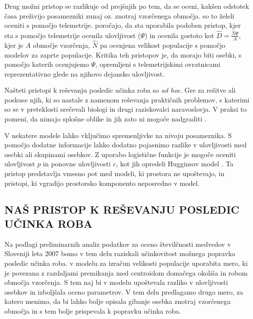 Drug možni pristop se razlikuje od prejšnjih po tem, da se oceni, kakšen odstotek časa preživijo posamezniki zunaj oz. znotraj vzorčenega območja. \citet{ivan_using_2013} so to želeli oceniti s pomočjo telemetrije. \citet{royle_spatial_2013} poročajo, da sta \citet{white_chapter_2001} uporabila podoben pristop, kjer sta s pomočjo telemetrije ocenila ulovljivost ($\Psi$) in ocenila gostoto kot $\hat{D} = \frac{\hat{N} \Psi}{A}$, kjer je $A$ območje vzorčenja, $\hat{N}$ pa ocenjena velikost populacije s pomočjo modelov za zaprte populacije. Kritika teh pristopov je, da morajo biti osebki, s pomočjo katerih ocenjujemo $\Psi$, opremljeni s telemetrijskimi ovratnicami reprezentativno glede na njihovo dejansko ulovljivost.

Našteti pristopi k reševanju posledic učinka roba so \textit{ad hoc}. Gre za rešitve ali poskuse njih, ki so nastale z namenom reševanja praktičnih problemov, s katerimi so se v preteklosti srečevali biologi in drugi raziskovalci naravoslovja. V praksi to pomeni, da nimajo splošne oblike in jih zato ni mogoče nadgraditi \citep{royle_spatial_2013}.

V nekatere modele lahko vključimo spremenljivke na nivoju posameznika. S pomočjo dodatne informacije lahko dodatno pojasnimo razlike v ulovljivosti med osebki ali skupinami osebkov. Z uporabo logistične funkcije je mogoče oceniti ulovljivost $p$ in ponovne ulovljivosti $c$, kot jih opredeli Hugginsov model \citep{boulanger_corrigendum_2001, boulanger_sources_2004}. Ta pristop predstavlja vmesno pot med modeli, ki prostora ne upoštevajo, in pristopi, ki vgradijo prostorsko komponento neposredno v model.

\subsection{NAŠ PRISTOP K REŠEVANJU POSLEDIC UČINKA ROBA}
Na podlagi preliminarnih analiz podatkov za oceno številčnosti medvedov v Sloveniji leta 2007 \citep{skrbinsek_lustrik_2019} bomo v tem delu raziskali učinkovitost možnega popravka posledic učinka roba. \citet{boulanger_corrigendum_2001} v modelu za izračun velikosti populacije uporabita mero, ki je povezana z razdaljami premikanja med centroidom domačega okoliša in robom območja vzorčenja. S tem naj bi v modelu upoštevala razliko v ulovljivosti osebkov in izboljšala oceno parametrov. V tem delu predlagamo drugo mero, za katero menimo, da bi lahko bolje opisala gibanje osebka znotraj vzorčenega območja in s tem bolje prispevala k popravku učinka roba.


